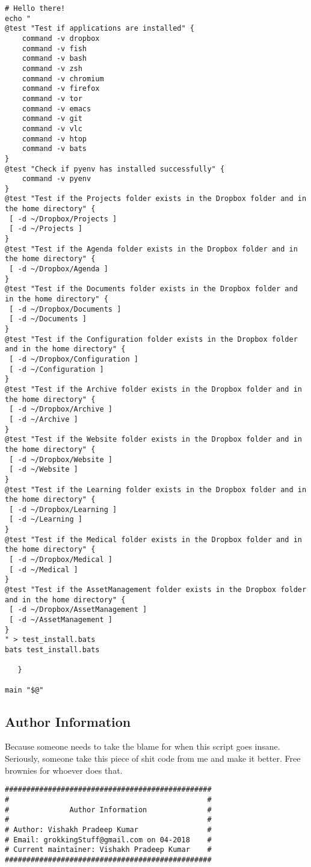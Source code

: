 \documentclass[11pt]{article}
\begin{document}
\begin{verbatim}
# Hello there!
echo "
@test "Test if applications are installed" {
    command -v dropbox
    command -v fish
    command -v bash
    command -v zsh
    command -v chromium
    command -v firefox
    command -v tor
    command -v emacs
    command -v git
    command -v vlc
    command -v htop
    command -v bats
}
@test "Check if pyenv has installed successfully" {
    command -v pyenv
}
@test "Test if the Projects folder exists in the Dropbox folder and in the home directory" {
 [ -d ~/Dropbox/Projects ]
 [ -d ~/Projects ]
}
@test "Test if the Agenda folder exists in the Dropbox folder and in the home directory" {
 [ -d ~/Dropbox/Agenda ]
}
@test "Test if the Documents folder exists in the Dropbox folder and in the home directory" {
 [ -d ~/Dropbox/Documents ]
 [ -d ~/Documents ]
}
@test "Test if the Configuration folder exists in the Dropbox folder and in the home directory" {
 [ -d ~/Dropbox/Configuration ]
 [ -d ~/Configuration ]
}
@test "Test if the Archive folder exists in the Dropbox folder and in the home directory" {
 [ -d ~/Dropbox/Archive ]
 [ -d ~/Archive ]
}
@test "Test if the Website folder exists in the Dropbox folder and in the home directory" {
 [ -d ~/Dropbox/Website ]
 [ -d ~/Website ]
}
@test "Test if the Learning folder exists in the Dropbox folder and in the home directory" {
 [ -d ~/Dropbox/Learning ]
 [ -d ~/Learning ]
}
@test "Test if the Medical folder exists in the Dropbox folder and in the home directory" {
 [ -d ~/Dropbox/Medical ]
 [ -d ~/Medical ]
}
@test "Test if the AssetManagement folder exists in the Dropbox folder and in the home directory" {
 [ -d ~/Dropbox/AssetManagement ]
 [ -d ~/AssetManagement ]
}
" > test_install.bats
bats test_install.bats

   }

main "$@"
\end{verbatim}

\subsection{Author Information}
\label{sec:org1606ccd}
Because someone needs to take the blame for when this script goes insane.
Seriously, someone take this piece of shit code from me and make it better.
Free brownies for whoever does that.

\begin{verbatim}
################################################
#                                              #
#              Author Information              #
#                                              #
# Author: Vishakh Pradeep Kumar                #
# Email: grokkingStuff@gmail.com on 04-2018    #
# Current maintainer: Vishakh Pradeep Kumar    #
################################################
\end{verbatim}
\end{document}
